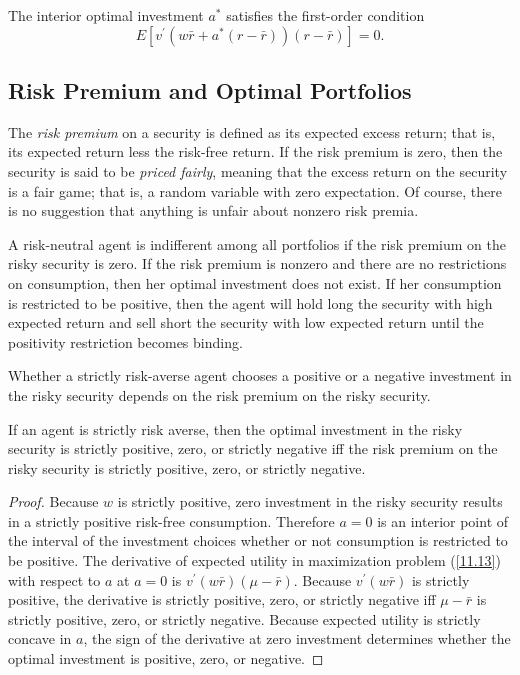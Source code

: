 \documentclass[\topdir/lecture\_notes.tex]{subfiles}
\begin{document}
The interior optimal investment \(a^{*}\) satisfies the first-order condition
\begin{equation*}
E\left[v^{\prime}\left(w \bar{r}+a^{*}(r-\bar{r})\right)(r-\bar{r})\right]=0. 
\end{equation*}

\subsection{Risk Premium and Optimal Portfolios}
The \emph{risk premium} on a security is defined as its expected excess return; that is, its expected return less the risk-free return. If the risk premium is zero, then the security is said to be \emph{priced fairly}, meaning that the excess return on the security is a fair game; that is, a random variable with zero expectation. Of course, there is no suggestion that anything is unfair about nonzero risk premia.

A risk-neutral agent is indifferent among all portfolios if the risk premium on the risky security is zero. If the risk premium is nonzero and there are no restrictions on consumption, then her optimal investment does not exist. If her consumption is restricted to be positive, then the agent will hold long the security with high expected return and sell short the security with low expected return until the positivity restriction becomes binding.

Whether a strictly risk-averse agent chooses a positive or a negative investment in the risky security depends on the risk premium on the risky security.
\begin{theorem}\label{thm:risk_premium_investment_direction}
If an agent is strictly risk averse, then the optimal investment in the risky security is strictly positive, zero, or strictly negative iff the risk premium on the risky security is strictly positive, zero, or strictly negative.
\end{theorem}
\begin{proof}
Because \(w\) is strictly positive, zero investment in the risky security results in a strictly positive risk-free consumption. Therefore \(a=0\) is an interior point of the interval of the investment choices whether or not consumption is restricted to be positive. The derivative of expected utility in maximization problem (\ref{11.13}) with respect to \(a\) at \(a=0\) is \(v^{\prime}(w \bar{r})(\mu-\bar{r})\). Because \(v^{\prime}(w \bar{r})\) is strictly positive, the derivative is strictly positive, zero, or strictly negative iff \(\mu-\bar{r}\) is strictly positive, zero, or strictly negative. Because expected utility is strictly concave in \(a\), the sign of the derivative at zero investment determines whether the optimal investment is positive, zero, or negative.
\end{proof}
\end{document}
